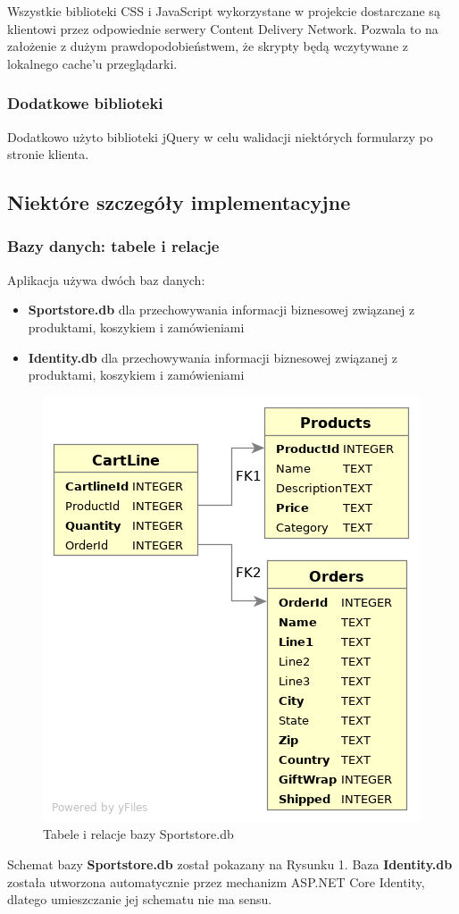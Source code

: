\documentclass[a4paper,10pt]{article}
\begin{document}
\par
Wszystkie biblioteki CSS i JavaScript wykorzystane w projekcie dostarczane są klientowi przez odpowiednie serwery Content Delivery Network. Pozwala to na założenie z dużym prawdopodobieństwem, że skrypty będą wczytywane z lokalnego cache'u przeglądarki.

\subsubsection{Dodatkowe biblioteki}
Dodatkowo użyto biblioteki jQuery w celu walidacji niektórych formularzy po stronie klienta.

\subsection{Niektóre szczegóły implementacyjne}
\subsubsection{Bazy danych: tabele i relacje}
Aplikacja używa dwóch baz danych: 
\begin{itemize}
 \item \textbf{Sportstore.db} dla przechowywania informacji biznesowej związanej z produktami, koszykiem i zamówieniami
 \item \textbf{Identity.db} dla przechowywania informacji biznesowej związanej z produktami, koszykiem i zamówieniami
\end{itemize}

\begin{figure}
 \centering
 \includegraphics[width=0.7\linewidth]{Images/dbDiagram.png}
 \caption{Tabele i relacje bazy Sportstore.db}
 \label{rys:}
\end{figure}
Schemat bazy \textbf{Sportstore.db} został pokazany na Rysunku 1.
Baza \textbf{Identity.db} została utworzona automatycznie przez mechanizm ASP.NET Core Identity, dlatego umieszczanie jej schematu nie ma sensu.
\end{document}
